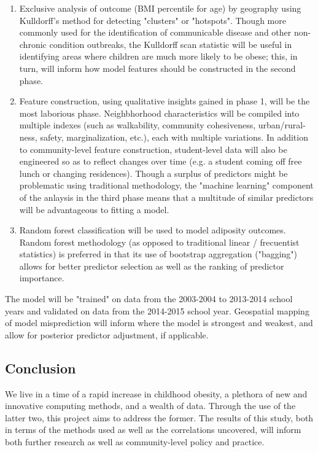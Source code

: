 \documentclass[11pt]{article}
\begin{document}
\begin{enumerate}
\item Exclusive analysis of outcome (BMI percentile for age) by geography using Kulldorff's method for detecting "clusters" or "hotspots".\cite{Kulldorff1997} Though more commonly used for the identification of communicable disease and other non-chronic condition outbreaks, the Kulldorff scan statistic will be useful in identifying areas where children are much more likely to be obese; this, in turn, will inform how model features should be constructed in the second phase.
\item Feature construction, using qualitative insights gained in phase 1, will be the most laborious phase. Neighbhorhood characteristics will be compiled into multiple indexes (such as walkability, community cohesiveness, urban/rural-ness, safety, marginalization, etc.), each with multiple variations. In addition to community-level feature construction, student-level data will also be engineered so as to reflect changes over time (e.g. a student coming off free lunch or changing residences). Though a surplus of predictors might be problematic using traditional methodology, the "machine learning" component of the anlaysis in the third phase means that a multitude of similar predictors will be advantageous to fitting a model. 
\item Random forest classification will be used to model adiposity outcomes.  Random forest methodology (as opposed to traditional linear / frecuentist statistics) is preferred in that its use of bootstrap aggregation ("bagging") allows for better predictor selection as well as the ranking of predictor importance.
\end{enumerate}

The model will be "trained" on data from the 2003-2004 to 2013-2014 school years and validated on data from the 2014-2015 school year.  Geospatial mapping of model misprediction will inform where the model is strongest and weakest, and allow for posterior predictor adjustment, if applicable.  

\subsection*{Conclusion}

We live in a time of a rapid increase in childhood obesity, a plethora of new and innovative computing methods, and a wealth of data.  Through the use of the latter two, this project aims to address the former.    
The results of this study, both in terms of the methods used as well as the correlations uncovered, will inform both further research as well as community-level policy and practice.  
\end{document}
